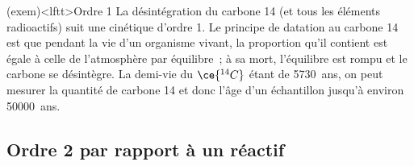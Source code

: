\documentclass[../../main/main.tex]{subfiles}
\begin{document}
\begin{tcb}[breakable](exem)<lftt>{Ordre 1}
	La désintégration du carbone 14 (et tous les éléments radioactifs) suit une
	cinétique d'ordre 1.
	\smallbreak
	Le principe de datation au carbone 14 est que pendant la
	vie d'un organisme vivant, la proportion qu'il contient est égale à celle de
	l'atmosphère par équilibre~; à sa mort, l'équilibre est rompu et le carbone se
	désintègre.
	\smallbreak
	La demi-vie du ${\ce{^{14}C}}$ étant de
	\SI{5730}{ans}, on peut mesurer la quantité de carbone 14 et donc l'âge d'un
	échantillon jusqu'à environ \SI{50000}{ans}.
\end{tcb}

\subsection{Ordre 2 par rapport à un réactif}
\end{document}
